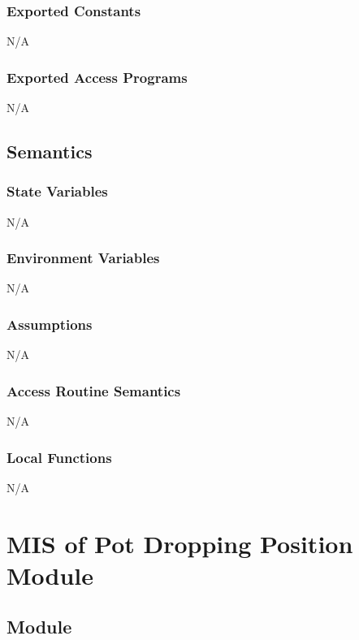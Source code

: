 \documentclass[12pt, titlepage]{article}
\begin{document}
\subsubsection{Exported Constants}
N/A

\subsubsection{Exported Access Programs}

N/A

\subsection{Semantics}

\subsubsection{State Variables}

N/A

\subsubsection{Environment Variables}

N/A

\subsubsection{Assumptions}

N/A
\subsubsection{Access Routine Semantics}

N/A

\subsubsection{Local Functions}

N/A

  \section{MIS of Pot Dropping Position Module} \label{potDroppingPosition} 

\subsection{Module}
\end{document}
